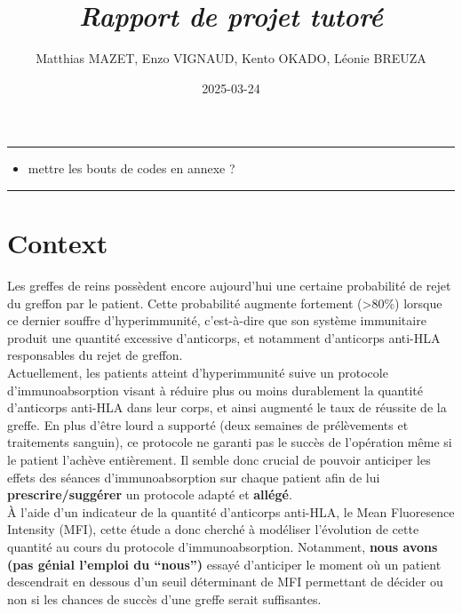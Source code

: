 \documentclass[
]{article}
\title{\textbf{\emph{Rapport de projet tutoré}}}
\author{Matthias MAZET, Enzo VIGNAUD, Kento OKADO, Léonie BREUZA}
\date{2025-03-24}
\providecommand{\tightlist}{%
  \setlength{\itemsep}{0pt}\setlength{\parskip}{0pt}}
\begin{document}
\maketitle

{
\setcounter{tocdepth}{2}
\tableofcontents
}
\newpage

\begin{center}\rule{0.5\linewidth}{0.5pt}\end{center}

\begin{itemize}
\tightlist
\item
  mettre les bouts de codes en annexe ?
\end{itemize}

\begin{center}\rule{0.5\linewidth}{0.5pt}\end{center}

\section{\texorpdfstring{\textbf{Context}}{Context}}\label{context}

Les greffes de reins possèdent encore aujourd'hui une certaine
probabilité de rejet du greffon par le patient. Cette probabilité
augmente fortement (\textgreater80\%) lorsque ce dernier souffre
d'hyperimmunité, c'est-à-dire que son système immunitaire produit une
quantité excessive d'anticorps, et notamment d'anticorps anti-HLA
responsables du rejet de greffon.\\
Actuellement, les patients atteint d'hyperimmunité suive un protocole
d'immunoabsorption visant à réduire plus ou moins durablement la
quantité d'anticorps anti-HLA dans leur corps, et ainsi augmenté le taux
de réussite de la greffe. En plus d'être lourd a supporté (deux semaines
de prélèvements et traitements sanguin), ce protocole ne garanti pas le
succès de l'opération même si le patient l'achève entièrement. Il semble
donc crucial de pouvoir anticiper les effets des séances
d'immunoabsorption sur chaque patient afin de lui
\textbf{prescrire/suggérer} un protocole adapté et \textbf{allégé}.\\
À l'aide d'un indicateur de la quantité d'anticorps anti-HLA, le Mean
Fluoresence Intensity (MFI), cette étude a donc cherché à modéliser
l'évolution de cette quantité au cours du protocole d'immunoabsorption.
Notamment, \textbf{nous avons (pas génial l'emploi du ``nous'')} essayé
d'anticiper le moment où un patient descendrait en dessous d'un seuil
déterminant de MFI permettant de décider ou non si les chances de succès
d'une greffe serait suffisantes.
\end{document}
